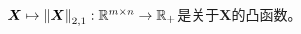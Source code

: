 
\begin{lemma}\kaishu
    $\boldsymbol{X}\mapsto\left\lVert\boldsymbol{X}\right\rVert_{2,1}:\mathbb{R}^{m\times n}\rightarrow\mathbb{R}_{+}$是关于$\boldsymbol{X}$的凸函数。
\end{lemma}

